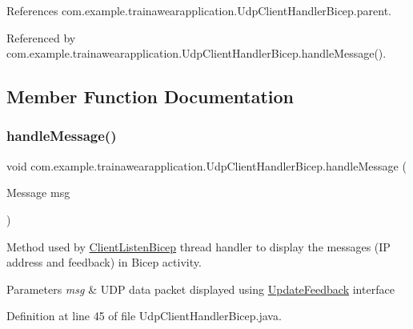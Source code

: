 References com.\+example.\+trainawearapplication.\+Udp\+Client\+Handler\+Bicep.\+parent.



Referenced by com.\+example.\+trainawearapplication.\+Udp\+Client\+Handler\+Bicep.\+handle\+Message().



\subsection{Member Function Documentation}
\mbox{\label{classcom_1_1example_1_1trainawearapplication_1_1_udp_client_handler_bicep_a083761d7050084ba7f64723dc178487a}} 
\subsubsection{\texorpdfstring{handleMessage()}{handleMessage()}}
{\footnotesize\ttfamily void com.\+example.\+trainawearapplication.\+Udp\+Client\+Handler\+Bicep.\+handle\+Message (\begin{DoxyParamCaption}\item[{Message}]{msg }\end{DoxyParamCaption})\hspace{0.3cm}{\ttfamily [inline]}}



Method used by \mbox{\hyperlink{classcom_1_1example_1_1trainawearapplication_1_1_client_listen_bicep}{Client\+Listen\+Bicep}} thread handler to display the messages (IP address and feedback) in Bicep activity. 


\begin{DoxyParams}{Parameters}
{\em msg} & U\+DP data packet displayed using \mbox{\hyperlink{interfacecom_1_1example_1_1trainawearapplication_1_1_update_feedback}{Update\+Feedback}} interface \\
\hline
\end{DoxyParams}


Definition at line 45 of file Udp\+Client\+Handler\+Bicep.\+java.


